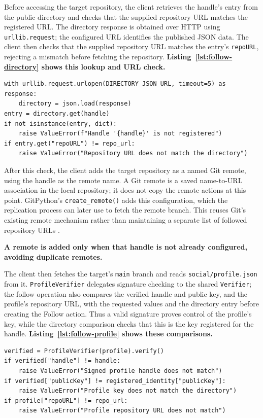 Before accessing the target repository, the client retrieves the
handle's entry from the public directory and checks that the supplied
repository URL matches the registered URL. The directory response is obtained
over HTTP using \texttt{urllib.request}; the configured URL identifies the
published JSON data. The client then checks that the supplied repository URL
matches the entry's \texttt{repoURL}, rejecting a mismatch before fetching the
repository. \textbf{Listing~\ref{lst:follow-directory} shows this lookup and
URL check.}

\begin{lstlisting}[caption={Checking a Follow target against the directory},label={lst:follow-directory}]
with urllib.request.urlopen(DIRECTORY_JSON_URL, timeout=5) as response:
    directory = json.load(response)
entry = directory.get(handle)
if not isinstance(entry, dict):
    raise ValueError(f"Handle '{handle}' is not registered")
if entry.get("repoURL") != repo_url:
    raise ValueError("Repository URL does not match the directory")
\end{lstlisting}

After this check, the client adds the target repository as a named Git
remote, using the handle as the remote name. A Git remote is a saved
name-to-URL association in the local repository; it does not copy the remote
actions at this point. GitPython's \texttt{create\_remote()} adds this
configuration, which the replication process can later use to fetch the
remote branch. This reuses Git's existing remote mechanism rather than
maintaining a separate list of followed repository URLs
\cite{github_remotes}.

\textbf{A remote is added only when that handle is not already configured,
avoiding duplicate remotes.}

The client then fetches the target's \texttt{main} branch and reads
\texttt{social/profile.json} from it. \texttt{ProfileVerifier} delegates
signature checking to the shared \texttt{Verifier}; the follow operation
also compares the verified handle and public key, and the profile's repository
URL, with the requested values and the directory entry before creating the
Follow action. Thus a valid signature proves control of the profile's key,
while the directory comparison checks that this is the key registered for
the handle. \textbf{Listing~\ref{lst:follow-profile} shows these
comparisons.}

\begin{lstlisting}[caption={Validating the fetched Follow profile},label={lst:follow-profile}]
verified = ProfileVerifier(profile).verify()
if verified["handle"] != handle:
    raise ValueError("Signed profile handle does not match")
if verified["publicKey"] != registered_identity["publicKey"]:
    raise ValueError("Profile key does not match the directory")
if profile["repoURL"] != repo_url:
    raise ValueError("Profile repository URL does not match")
\end{lstlisting}


